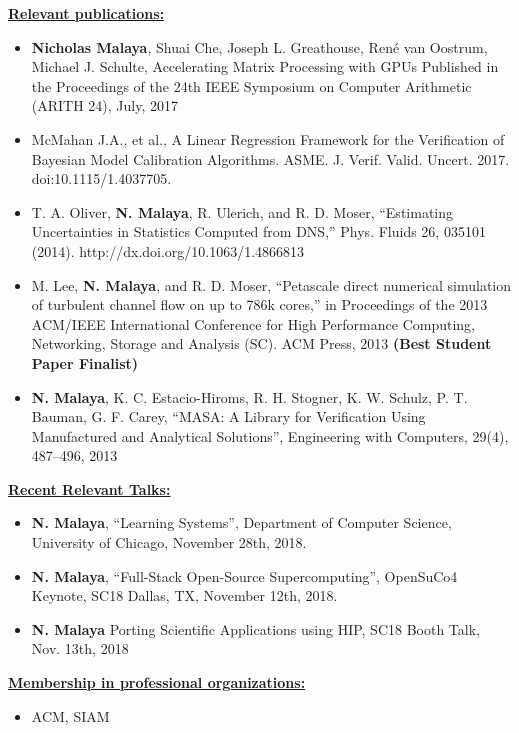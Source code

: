 \documentclass[12pt]{article}
\newcommand{\makesection}[1]{\underline{\bfseries #1:}}
\begin{document}
\makesection{Relevant publications}
\begin{itemize}
\item \textbf{Nicholas Malaya}, Shuai Che, Joseph L. Greathouse, René van Oostrum,
Michael J. Schulte, Accelerating Matrix Processing with GPUs
Published in the Proceedings of the 24th IEEE Symposium on Computer
Arithmetic (ARITH 24), July, 2017 

\item McMahan J.A., et al., A Linear Regression
Framework for the Verification of Bayesian Model Calibration
Algorithms. ASME. J. Verif. Valid. Uncert. 2017. doi:10.1115/1.4037705. 

\item T. A. Oliver, \textbf{N. Malaya}, R. Ulerich, and R. D. Moser, “Estimating
Uncertainties in Statistics Computed from DNS,”
Phys. Fluids 26, 035101 (2014). http://dx.doi.org/10.1063/1.4866813 

\item M. Lee, \textbf{N. Malaya}, and R. D. Moser, ``Petascale direct numerical simulation of turbulent channel flow on up to 786k cores,'' in Proceedings 
of the 2013 ACM/IEEE International Conference for High Performance
Computing, Networking, Storage and Analysis (SC). ACM Press, 2013 {\bf(Best
Student Paper Finalist)}

\item \textbf{N. Malaya}, K. C. Estacio-Hiroms, R. H. Stogner, K. W. Schulz, P. T. Bauman,
G. F. Carey, ``MASA: A Library for Verification Using Manufactured and Analytical Solutions'',
Engineering with Computers, 29(4), 487--496, 2013
\end{itemize}

\makesection{Recent Relevant Talks}
\begin{itemize}
\item \textbf{N. Malaya}, ``Learning Systems'', Department of Computer Science, 
		 University of Chicago, November 28th, 2018. 

\item \textbf{N. Malaya}, ``Full-Stack Open-Source Supercomputing'', OpenSuCo4 Keynote, SC18
		 Dallas, TX, November 12th, 2018. 

\item \textbf{N. Malaya} Porting Scientific Applications using HIP, SC18 Booth Talk, Nov. 13th, 2018 
\end{itemize}


\makesection{Membership in professional organizations}
\begin{itemize}
\item ACM, SIAM
\end{itemize}
\end{document}
